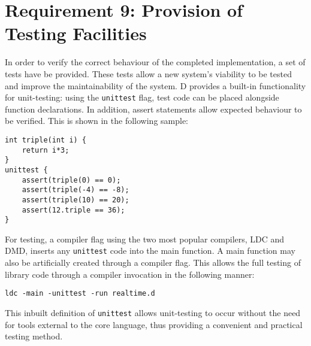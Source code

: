 \section{Requirement 9: Provision of Testing Facilities}
In order to verify the correct behaviour of the completed implementation, a set 
of tests have be provided. These tests allow a new system's viability 
to be tested and improve the maintainability of the system. D provides a built-in 
functionality for unit-testing: using the \texttt{unittest} flag, test code can 
be placed alongside function declarations. In addition, assert statements allow 
expected behaviour to be verified. 
This is shown in the following sample:
\begin{lstlisting}
int triple(int i) {
    return i*3; 
}
unittest {
    assert(triple(0) == 0); 
    assert(triple(-4) == -8); 
    assert(triple(10) == 20); 
    assert(12.triple == 36);
}
\end{lstlisting}
For testing, a compiler flag using the two most popular compilers, LDC and DMD, 
inserts any \texttt{unittest} code into the main function. A main function may 
also be artificially created through a compiler flag. This allows the 
full testing of library code through a compiler invocation in the following manner: 
\begin{lstlisting}
ldc -main -unittest -run realtime.d
\end{lstlisting}
This inbuilt definition of \texttt{unittest} allows unit-testing to occur 
without the need for tools external to the core language, thus providing a convenient 
and practical testing method. 

